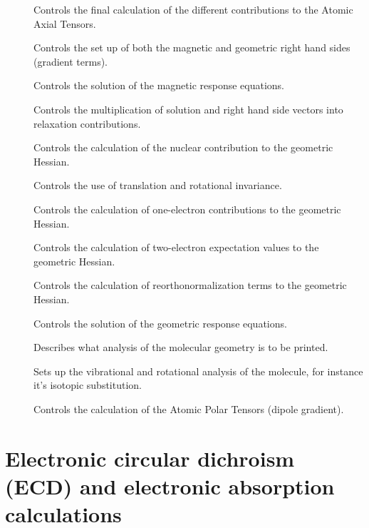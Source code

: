 \begin{description}
\item[] Controls the final calculation of the different
contributions to the Atomic Axial Tensors.
\item[] Controls the set up of both the magnetic and
geometric right hand sides (gradient terms).
\item[] Controls the solution of the magnetic response
equations.
\item[] Controls the multiplication of solution and right hand
side vectors into relaxation contributions.
\item[] Controls the calculation of the nuclear
contribution to the geometric Hessian.
\item[] Controls the use of translation and rotational invariance.
\item[] Controls the calculation of one-electron
contributions to the geometric Hessian.
\item[] Controls the calculation of two-electron
expectation values to the geometric Hessian.
\item[] Controls the calculation of reorthonormalization
terms to the geometric Hessian.
\item[] Controls the solution of the geometric response equations.
\item[] Describes what analysis of the molecular geometry
is to be printed.
\item[] Sets up the vibrational and rotational analysis of the
molecule, for instance it's isotopic substitution.
\item[] Controls the calculation of the Atomic Polar
Tensors (dipole gradient).
\end{description}

\section{Electronic circular dichroism (ECD) and electronic absorption
calculations}\label{sec:ecd} 

\begin{center}
\end{center}

